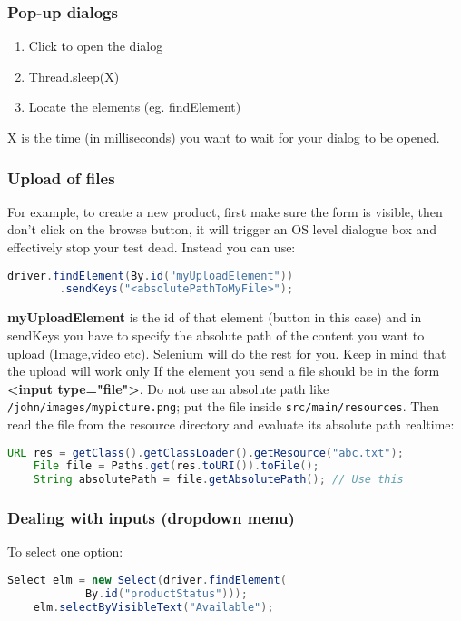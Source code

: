 \documentclass[a4paper, 10pt, titlepage]{article}
\begin{document}
\subsubsection*{Pop-up dialogs}
\begin{enumerate}
\item Click to open the dialog
\item Thread.sleep(X)
\item Locate the elements (eg. findElement)
\end{enumerate}
X is the time (in milliseconds) you want to wait for your dialog to be opened.

\subsubsection*{Upload of files}
For example, to create a new product, first make sure the form is visible, then don't click on the browse button, it will trigger an OS level dialogue box and effectively stop your test dead. Instead you can use:
\begin{lstlisting}[language=java]
	driver.findElement(By.id("myUploadElement"))
		.sendKeys("<absolutePathToMyFile>");
\end{lstlisting}
\textbf{myUploadElement} is the id of that element (button in this case) and in sendKeys you have to specify the absolute path of the content you want to upload (Image,video etc). 
Selenium will do the rest for you. Keep in mind that the upload will work only If the element you send a file should be in the form \textbf{<input type="file">}. 
Do not use an absolute path like \lstinline|/john/images/mypicture.png|; put the file inside \lstinline|src/main/resources|.
Then read the file from the resource directory and evaluate its absolute path realtime:
\begin{lstlisting}[language=java]
	URL res = getClass().getClassLoader().getResource("abc.txt");
	File file = Paths.get(res.toURI()).toFile();
	String absolutePath = file.getAbsolutePath(); // Use this
\end{lstlisting}

\subsubsection*{Dealing with inputs (dropdown menu)}
To select one option:
\begin{lstlisting}[language=java]
	Select elm = new Select(driver.findElement(
			By.id("productStatus")));
	elm.selectByVisibleText("Available");
\end{lstlisting}
\end{document}
